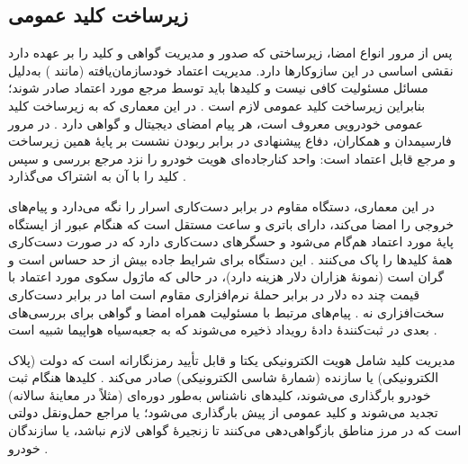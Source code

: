 \documentclass[12pt,a4paper]{article}
\begin{document}
\subsection{زیرساخت کلید عمومی}

پس از مرور انواع امضا، زیرساختی که صدور و مدیریت گواهی و کلید را بر عهده دارد نقشی اساسی در این سازوکار‌ها دارد. مدیریت اعتماد خودسازمان‌یافته (مانند ) به‌دلیل مسائل مسئولیت کافی نیست و کلید‌ها باید توسط مرجع مورد اعتماد صادر شوند؛ بنابراین زیرساخت کلید عمومی لازم است \cite{SecuringVehicularAd}. در این معماری که به زیرساخت کلید عمومی خودرویی معروف است، هر پیام امضای دیجیتال و گواهی  دارد \cite{SecuringVehicularAd}. در مرور فارسیمدان و همکاران، دفاع پیشنهادی در برابر ربودن نشست بر پایهٔ همین زیرساخت و مرجع قابل اعتماد است: واحد کنارجاده‌ای هویت خودرو را نزد مرجع بررسی و سپس کلید را با آن به اشتراک می‌گذارد \cite{farsimadanReviewSecurityChallenges2025}.

در این معماری، دستگاه مقاوم در برابر دست‌کاری اسرار را نگه می‌دارد و پیام‌های خروجی را امضا می‌کند، دارای باتری و ساعت مستقل است که هنگام عبور از ایستگاه پایهٔ مورد اعتماد هم‌گام می‌شود و حسگر‌های دست‌کاری دارد که در صورت دست‌کاری همهٔ کلید‌ها را پاک می‌کنند \cite{SecuringVehicularAd}. این دستگاه برای شرایط جاده بیش از حد حساس است و گران است (نمونهٔ  هزاران دلار هزینه دارد)، در حالی که ماژول سکوی مورد اعتماد با قیمت چند ده دلار در برابر حملهٔ نرم‌افزاری مقاوم است اما در برابر دست‌کاری سخت‌افزاری نه \cite{SecuringVehicularAd}. پیام‌های مرتبط با مسئولیت همراه امضا و گواهی برای بررسی‌های بعدی در ثبت‌کنندهٔ دادهٔ رویداد ذخیره می‌شوند که به جعبه‌سیاه هواپیما شبیه است \cite{SecuringVehicularAd}.

مدیریت کلید شامل هویت الکترونیکی یکتا و قابل تأیید رمزنگارانه است که دولت (پلاک الکترونیکی) یا سازنده (شمارهٔ شاسی الکترونیکی) صادر می‌کند \cite{SecuringVehicularAd}. کلید‌ها هنگام ثبت خودرو بارگذاری می‌شوند، کلید‌های ناشناس به‌طور دوره‌ای (مثلاً در معاینهٔ سالانه) تجدید می‌شوند و کلید عمومی  از پیش بارگذاری می‌شود؛  یا مراجع حمل‌ونقل دولتی است که در مرز مناطق بازگواهی‌دهی می‌کنند تا زنجیرهٔ گواهی لازم نباشد، یا سازندگان خودرو \cite{SecuringVehicularAd}.
\end{document}
